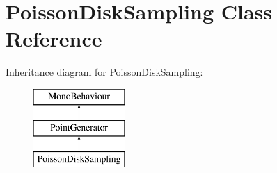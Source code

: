 \hypertarget{class_poisson_disk_sampling}{}\section{Poisson\+Disk\+Sampling Class Reference}
\label{class_poisson_disk_sampling}
Inheritance diagram for Poisson\+Disk\+Sampling\+:\begin{figure}[H]
\begin{center}
\leavevmode
\includegraphics[height=3.000000cm]{class_poisson_disk_sampling}
\end{center}
\end{figure}
